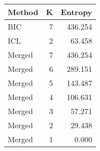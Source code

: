 \begin{center} 
\begin{tabular}{lrr}
 Method & K & Entropy \\ 
  \hline
\hline
BIC &    7 & 436.254 \\ 
  ICL &    2 & 63.458 \\ 
  Merged &    7 & 436.254 \\ 
  Merged &    6 & 289.151 \\ 
  Merged &    5 & 143.487 \\ 
  Merged &    4 & 106.631 \\ 
  Merged &    3 & 57.271 \\ 
  Merged &    2 & 29.438 \\ 
  Merged &    1 & 0.000 \\ 
  \end{tabular}
\end{center} 
